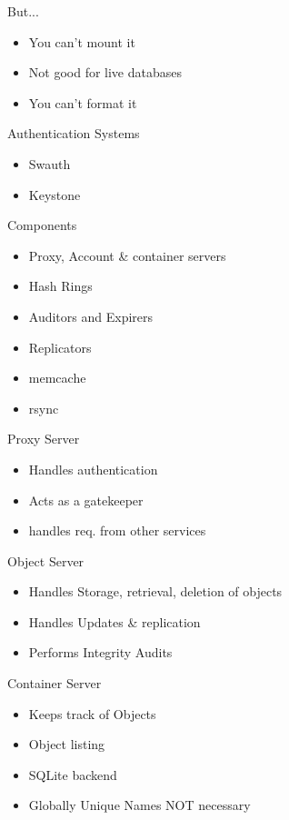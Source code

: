 \documentclass{beamer}
\begin{document}
\begin{frame}{But...}
\begin{itemize}
 \item You can't mount it
 \item Not good for live databases
 \item You can't format it
\end{itemize}
\end{frame}

\begin{frame}{Authentication Systems}
\begin{itemize}
 \item Swauth
 \item Keystone
\end{itemize}
\end{frame}

\begin{frame}{Components}
\begin{itemize}
 \item Proxy, Account \& container servers
 \item Hash Rings
 \item Auditors and Expirers
 \item Replicators
 \item memcache
 \item rsync
\end{itemize}
\end{frame}

\begin{frame}{Proxy Server}
\begin{itemize}
 \item Handles authentication
 \item Acts as a gatekeeper
 \item handles req. from other services
\end{itemize}
\end{frame}

\begin{frame}{Object Server}
\begin{itemize}
 \item Handles Storage, retrieval, deletion of objects
 \item Handles Updates \& replication
 \item Performs Integrity Audits
\end{itemize}
\end{frame}

\begin{frame}{Container Server}
\begin{itemize}
 \item Keeps track of Objects
 \item Object listing
 \item SQLite backend
 \item Globally Unique Names NOT necessary
\end{itemize}
\end{frame}
\end{document}
